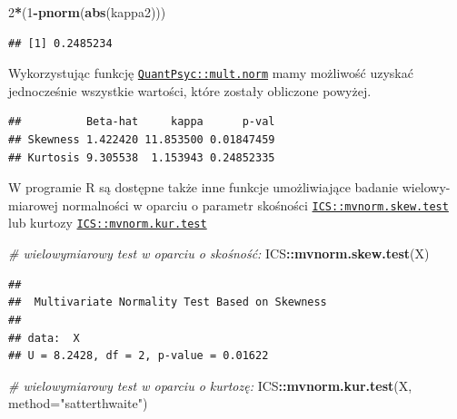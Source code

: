 \documentclass[polish,]{book}
\newenvironment{Shaded}{\begin{snugshade}}{\end{snugshade}}
\newcommand{\CommentTok}[1]{\textcolor[rgb]{0.56,0.35,0.01}{\textit{#1}}}
\newcommand{\DataTypeTok}[1]{\textcolor[rgb]{0.13,0.29,0.53}{#1}}
\newcommand{\DecValTok}[1]{\textcolor[rgb]{0.00,0.00,0.81}{#1}}
\newcommand{\KeywordTok}[1]{\textcolor[rgb]{0.13,0.29,0.53}{\textbf{#1}}}
\newcommand{\NormalTok}[1]{#1}
\newcommand{\OperatorTok}[1]{\textcolor[rgb]{0.81,0.36,0.00}{\textbf{#1}}}
\newcommand{\StringTok}[1]{\textcolor[rgb]{0.31,0.60,0.02}{#1}}
\begin{document}
\begin{Shaded}
\begin{Highlighting}[]
\DecValTok{2}\OperatorTok{*}\NormalTok{(}\DecValTok{1}\OperatorTok{-}\KeywordTok{pnorm}\NormalTok{(}\KeywordTok{abs}\NormalTok{(kappa2)))}
\end{Highlighting}
\end{Shaded}

\begin{verbatim}
## [1] 0.2485234
\end{verbatim}

Wykorzystując funkcję \href{https://rdrr.io/cran/QuantPsyc/man/mult.norm.html}{\texttt{QuantPsyc::mult.norm}} mamy możliwość uzyskać jednocześnie wszystkie wartości, które zostały obliczone powyżej.

\begin{Shaded}
\end{Shaded}

\begin{verbatim}
##          Beta-hat     kappa      p-val
## Skewness 1.422420 11.853500 0.01847459
## Kurtosis 9.305538  1.153943 0.24852335
\end{verbatim}

W programie R są dostępne także inne funkcje umożliwiające badanie wielowy-
miarowej normalności w oparciu o parametr skośności \href{https://rdrr.io/cran/ICS/man/mvnorm.skew.test.html}{\texttt{ICS::mvnorm.skew.test}} lub
kurtozy \href{https://rdrr.io/cran/ICS/man/mvnorm.kur.test.html}{\texttt{ICS::mvnorm.kur.test}}

\begin{Shaded}
\begin{Highlighting}[]
\CommentTok{# wielowymiarowy test w oparciu o skośność:}
\NormalTok{ICS}\OperatorTok{::}\KeywordTok{mvnorm.skew.test}\NormalTok{(X)}
\end{Highlighting}
\end{Shaded}

\begin{verbatim}
## 
##  Multivariate Normality Test Based on Skewness
## 
## data:  X
## U = 8.2428, df = 2, p-value = 0.01622
\end{verbatim}

\begin{Shaded}
\begin{Highlighting}[]
\CommentTok{# wielowymiarowy test w oparciu o kurtozę:}
\NormalTok{ICS}\OperatorTok{::}\KeywordTok{mvnorm.kur.test}\NormalTok{(X, }\DataTypeTok{method=}\StringTok{"satterthwaite"}\NormalTok{)}
\end{Highlighting}
\end{Shaded}
\end{document}
